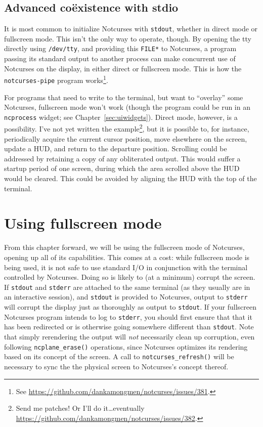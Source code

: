 \documentclass[letterpaper,10pt]{article}
\begin{document}
\subsection{Advanced coëxistence with stdio}
It is most common to initialize Notcurses with \texttt{stdout}, whether in
direct mode or fullscreen mode. This isn't the only way to operate, though.
By opening the tty directly using \texttt{/dev/tty}\cite{tty4}, and providing
this \texttt{FILE*} to Notcurses, a program passing its standard output to
another process can make concurrent use of Notcurses on the display, in either
direct or fullscreen mode. This is how the \texttt{notcurses-pipe} program
works\footnote{See \url{https://github.com/dankamongmen/notcurses/issues/381}.}.

For programs that need to write to the terminal, but want to ``overlay'' some
Notcurses, fullscreen mode won't work (though the program could be run in an
\texttt{ncprocess} widget; see Chapter~\ref{sec:uiwidgets}). Direct mode, however, is
a possibility. I've not yet written the example\footnote{Send me patches! Or
I'll do it\ldots eventually \url{https://github.com/dankamongmen/notcurses/issues/382}.}, but it is possible to, for
instance, periodically acquire the current cursor position, move elsewhere on
the screen, update a HUD, and return to the departure position. Scrolling could
be addressed by retaining a copy of any obliterated output. This would suffer
a startup period of one screen, during which the area scrolled above the HUD
would be cleared. This could be avoided by aligning the HUD with the top of
the terminal.

\newpage

\section{Using fullscreen mode}
From this chapter forward, we will be using the fullscreen mode of Notcurses,
opening up all of its capabilities. This comes at a cost: while fullscreen mode
is being used, it is not safe to use standard I/O in conjunction with the
terminal controlled by Notcurses. Doing so is likely to (at a minimum) corrupt
the screen. If \texttt{stdout} and \texttt{stderr} are attached to the same
terminal (as they usually are in an interactive session), and \texttt{stdout}
is provided to Notcurses, output to \texttt{stderr} will corrupt the display
just as thoroughly as output to \texttt{stdout}. If your fullscreen Notcurses
program intends to log to \texttt{stderr}, you should first ensure that that
it has been redirected or is otherwise going somewhere different than
\texttt{stdout}. Note that simply rerendering the output will \textit{not}
necessarily clean up corruption, even following \texttt{ncplane\_erase()}
operations, since Notcurses optimizes its rendering based on its concept of the
screen. A call to \texttt{notcurses\_refresh()} will be necessary to sync the
the physical screen to Notcurses's concept thereof.
\end{document}
